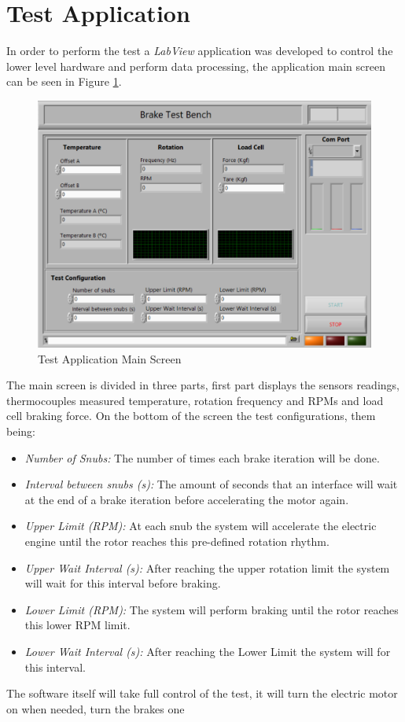 \section{Test Application}\label{ssec:testApplication}
	In order to perform the test a \textit{LabView} application was developed to control the lower level hardware and perform data processing, the application main screen can be seen in Figure \ref{fig:labview-app-mainscreen}.

	\begin{figure}[htbp]
		\centering
		\includegraphics[width=1\textwidth]{figuras/fig-labview-app-mainscreen}
		\caption{Test Application Main Screen}
		\label{fig:labview-app-mainscreen}
	\end{figure}

	The main screen is divided in three parts, first part displays the sensors readings, thermocouples measured temperature, rotation frequency and RPMs and load cell braking force. On the bottom of the screen the test configurations, them being:

	\begin{itemize}
		\item\textit{Number of Snubs:} The number of times each brake iteration will be done.
		\item\textit{Interval between snubs (s):} The amount of seconds that an interface will wait at the end of a brake iteration before accelerating the motor again.
		\item\textit{Upper Limit (RPM):} At each snub the system will accelerate the electric engine until the rotor reaches this pre-defined rotation rhythm.
		\item\textit{Upper Wait Interval (s):} After reaching the upper rotation limit the system will wait for this interval before braking.
		\item\textit{Lower Limit (RPM):} The system will perform braking until the rotor reaches this lower RPM limit.
		\item\textit{Lower Wait Interval (s):} After reaching the Lower Limit the system will for this interval.
	\end{itemize}

	The software itself will take full control of the test, it will turn the electric motor on when needed, turn the brakes one